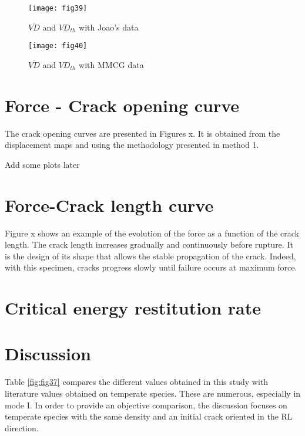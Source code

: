 \begin{figure}[htp]
	\begin{minipage}[c]{.46\linewidth}
		\centering
		\texttt{[image: fig39]}
		\caption{$\overline{VD}$ and $VD_{th}$ with Joao's data}
		\label{fig:fig39}
	\end{minipage}
	\hfill%
	\begin{minipage}[c]{.46\linewidth}
		\centering
		\texttt{[image: fig40]}
		\caption{$\overline{VD}$ and $VD_{th}$ with MMCG data}
		\label{fig:fig40}
	\end{minipage}
\end{figure}


\section{Force - Crack opening curve}

The crack opening curves are presented in Figures x. It is obtained from the displacement maps and using the methodology presented in method 1.

Add some plots later

\section{Force-Crack length curve}

Figure x shows an example of the evolution of the force as a function of the crack length. The crack length increases gradually and continuously before rupture. It is the design of its shape that allows the stable propagation of the crack. Indeed, with this specimen, cracks progress slowly until failure occurs at maximum force.

\section{Critical energy restitution rate}

\section{Discussion}

Table \ref{fig:fig37} compares the different values obtained in this study with literature values obtained on temperate species. These are numerous, especially in mode I. In order to provide an objective comparison, the discussion focuses on temperate species with the same density and an initial crack oriented in the RL direction.


